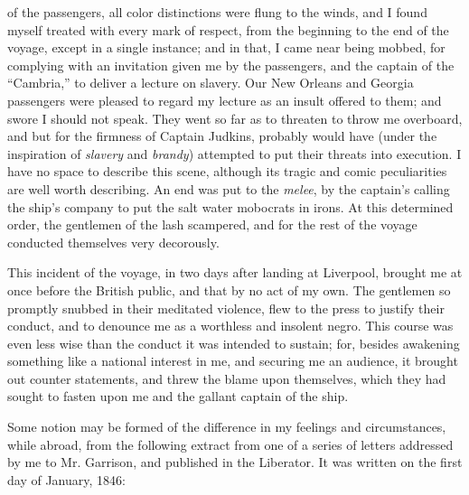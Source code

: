 of the passengers, all color distinctions were flung to the winds, and I
found myself treated with every mark of respect, from the beginning to
the end of the voyage, except in a single instance; and in that, I came
near being mobbed, for complying with an invitation given me by the
passengers, and the captain of the ``Cambria,'' to deliver a lecture on
slavery. Our New Orleans and Georgia passengers were pleased to regard
my lecture as an insult offered to them; and swore I should not speak.
They went so far as to threaten to throw me overboard, and but for the
firmness of Captain Judkins, probably would have (under the inspiration
of \emph{slavery} and \emph{brandy}) attempted to put their threats into
execution. I have no space to describe this scene, although its tragic
and comic peculiarities are well worth describing. An end was put to the
\emph{melee}, by the captain's calling the ship's company to put the
salt water mobocrats in irons. At this determined order, the gentlemen
of the lash scampered, and for the rest of the voyage conducted
themselves very decorously.

This incident of the voyage, in two days after landing at Liverpool,
brought me at once before the British public, and that by no act of my
own. The gentlemen so promptly snubbed in their meditated violence, flew
to the press to justify their conduct, and to denounce me as a worthless
and insolent negro. This course was even less wise than the conduct it
{\protect\hypertarget{368}{}{}}was intended to sustain; for, besides
awakening something like a national interest in me, and securing me an
audience, it brought out counter statements, and threw the blame upon
themselves, which they had sought to fasten upon me and the gallant
captain of the ship.

Some notion may be formed of the difference in my feelings and
circumstances, while abroad, from the following extract from one of a
series of letters addressed by me to Mr. Garrison, and published in the
Liberator. It was written on the first day of January, 1846:

